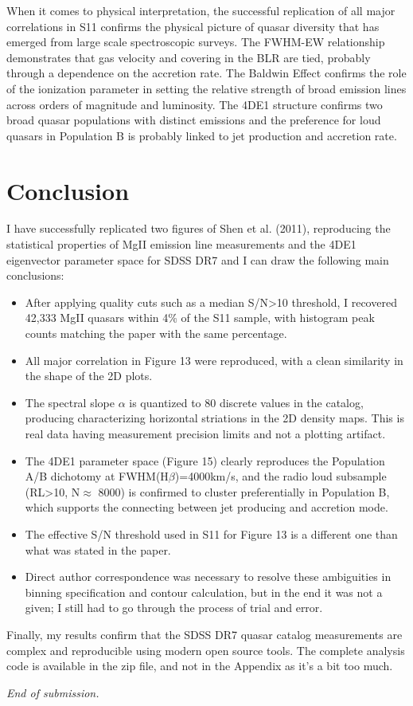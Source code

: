 \documentclass[11pt,a4paper]{article}
\begin{document}
When it comes to physical interpretation, the successful replication of all major correlations in S11 confirms the physical picture of quasar diversity that has emerged from large scale spectroscopic surveys. The FWHM-EW relationship demonstrates that gas velocity and covering in the BLR are tied, probably through a dependence on the accretion rate. The Baldwin Effect confirms the role of the ionization parameter in setting the relative strength of broad emission lines across orders of magnitude and luminosity. The 4DE1 structure confirms two broad quasar populations with distinct emissions and the preference for loud quasars in Population B is probably linked to jet production and accretion rate.

\section{Conclusion}

I have successfully replicated two figures of Shen et al. (2011), reproducing the statistical properties of MgII emission line measurements and the 4DE1 eigenvector parameter space for SDSS DR7 and I can draw the following main conclusions:
\begin{itemize}
    \item After applying quality cuts such as a median S/N>10 threshold, I recovered 42,333 MgII quasars within 4\% of the S11 sample, with histogram peak counts matching the paper with the same percentage. 
    \item All major correlation in Figure 13 were reproduced, with a clean similarity in the shape of the 2D plots. 
    \item The spectral slope $\alpha$ is quantized to 80 discrete values in the catalog, producing characterizing horizontal striations in the 2D density maps. This is real data having measurement precision limits and not a plotting artifact.
    \item  The 4DE1 parameter space (Figure 15) clearly reproduces the Population A/B dichotomy at FWHM(H$\beta$)=4000km/s, and the radio loud subsample (RL>10, N$\approx$ 8000) is confirmed to cluster preferentially in Population B, which supports the connecting between jet producing and accretion mode.
    \item The effective S/N threshold used in S11 for Figure 13 is a different one than what was stated in the paper.
    \item Direct author correspondence was necessary to resolve these ambiguities in binning specification and contour calculation, but in the end it was not a given; I still had to go through the process of trial and error.
\end{itemize}

Finally, my results confirm that the SDSS DR7 quasar catalog measurements are complex and reproducible using modern open source tools. The complete analysis code is available in the zip file, and not in the Appendix as it's a bit too much.


\printbibliography



\bigskip
\noindent\textit{End of submission.}
\end{document}

